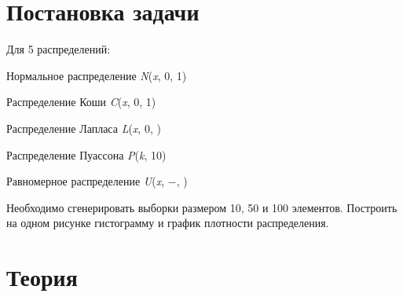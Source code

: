 \documentclass[a4paper]{article}
\begin{document}
\begin{center}
    \tableofcontents
\end{center}
\setcounter{page}{2}
\newpage

\begin{center}
    \listoffigures
\end{center}
\newpage

\begin{center}
    \listoftabels
\end{center}
\newpage

\section{Постановка задачи}
 Для 5 распределений:
 \begin{enumerate}
    \begin{item}
            Нормальное распределение \textit{N}(\normalsize{\textit{x}}, \normalsize{0}, \normalsize{1})
        \end{item}
        \begin{item}
            Распределение Коши \textit{C}(\normalsize{\textit{x}}, \normalsize{0}, \normalsize{1})
        \end{item}
        \begin{item}
            Распределение Лапласа \textit{L}(\normalsize{\textit{x}}, \normalsize{0}, \scriptsize{})
        \end{item} 
        \begin{item} 
            Распределение Пуассона \textit{P}(\normalsize{\textit{k}}, \normalsize{10})
        \end{item}
        \begin{item}
            Равномерное распределение \textit{U}(\normalsize{\textit{x}}, \normalsize{$-$}, \normalsize{})
        \end{item}
 \end{enumerate}
 Необходимо сгенерировать выборки размером 10, 50 и 100
 элементов.
 Построить на одном рисунке гистограмму и график плотности распределения.
 
\section{Теория}
\end{document}
